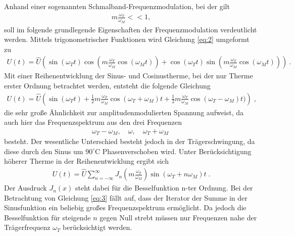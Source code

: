Anhand einer sogenannten Schmalband-Frequenzmodulation, bei der gilt 
\begin{align}
	m\frac{\omega_T}{\omega_M}<<1,
\end{align}
soll im folgende grundlegende Eigenschaften der Frequenzmodulation verdeutlicht werden. Mittels trigonometrischer Funktionen wird Gleichung \eqref{eq:2} umgeformt zu
\begin{align}
	U(t)=\hat{U}\left(\sin{(\omega_Tt)}\cos{\left(m\frac{\omega_T}{\omega_M}\cos{(\omega_Mt)}\right)} + \cos{(\omega_Tt)}\sin{\left(m\frac{\omega_T}{\omega_M}\cos{(\omega_Mt)}\right)}\right) \:.
\end{align}
Mit einer Reihenentwicklung der Sinus- und Cosinustherme, bei der nur Therme erster Ordnung betrachtet werden, entsteht die folgende Gleichung
\begin{align}
	U(t)=\hat{U}\left(\sin{(\omega_Tt)+\frac{1}{2}m\frac{\omega_T}{\omega_M}\cos{(\omega_T+\omega_M)t}}+\frac{1}{2}m\frac{\omega_T}{\omega_M}\cos{(\omega_T-\omega_M)t})\right)\;,
\end{align}
die sehr große Ähnlichkeit zur amplitudenmodulierten Spannung aufweist, da auch hier das Frequenzspektrum aus den drei Frequenzen
\begin{align}
	\omega_T-\omega_M,\quad\omega,\quad\omega_T+\omega_M\;
\end{align}
besteht. Der wesentliche Unterschied besteht jedoch in der Trägerschwingung, da diese durch den Sinus um $90^{\circ}\text{C}$ Phasenverschoben wird.
Unter Berücksichtigung höherer Therme in der Reihenentwicklung ergibt sich 
\begin{align}
	U(t)=\hat{U}\sum_{n=-\infty}^{\infty} J_n\left(m\frac{\omega_T}{\omega_M}\right)\sin{(\omega_T+n\omega_M)}t\;. 
	\label{eq:3}
\end{align}
Der Ausdruck $J_n(x)$ steht dabei für die Besselfunktion n-ter Ordnung. Bei der Betrachtung von Gleichung \eqref{eq:3} fällt auf, dass der Iterator der Summe in der Sinusfunktion ein beliebig großes Frequenzspektrum ermöglicht. Da jedoch die Besselfunktion für steigende $n$ gegen Null strebt müssen nur Frequenzen nahe der Trägerfrequenz $\omega_T$ berücksichtigt werden.


